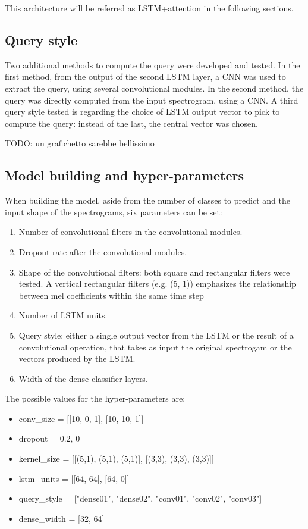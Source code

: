 This architecture will be referred as LSTM+attention in the following sections.

\subsection{Query style}

Two additional methods to compute the query were developed and tested.
In the first method, from the output of the second LSTM layer, a CNN was used
to extract the query, using several convolutional modules.
In the second method, the query was directly computed from the input
spectrogram, using a CNN.
A third query style tested is regarding the choice of LSTM output vector to
pick to compute the query: instead of the last, the central vector was chosen.

TODO: un grafichetto sarebbe bellissimo

\subsection{Model building and hyper-parameters}

When building the model, aside from the number of classes to predict and the
input shape of the spectrograms, six parameters can be set:
\begin{enumerate}
    \item Number of convolutional filters in the convolutional modules.
    \item Dropout rate after the convolutional modules.
    \item Shape of the convolutional filters:
        both square and rectangular filters were tested.
        A vertical rectangular filters (e.g. (5, 1)) emphasizes the
        relationship between mel coefficients within the same time step
    \item Number of LSTM units.
    \item Query style: either a single output vector from the LSTM or the
        result of a convolutional operation, that takes as input the original
        spectrogam or the vectors produced by the LSTM.
    \item Width of the dense classifier layers.
\end{enumerate}
The possible values for the hyper-parameters are:
\begin{itemize}
    \item conv\_size = [[10, 0, 1], [10, 10, 1]]
    \item dropout = {0.2, 0}
    \item kernel\_size = [[(5,1), (5,1), (5,1)], [(3,3), (3,3), (3,3)]]
    \item lstm\_units = [[64, 64], [64, 0]]
    \item query\_style = ["dense01", "dense02", "conv01", "conv02", "conv03"]
    \item dense\_width = [32, 64]
\end{itemize}

